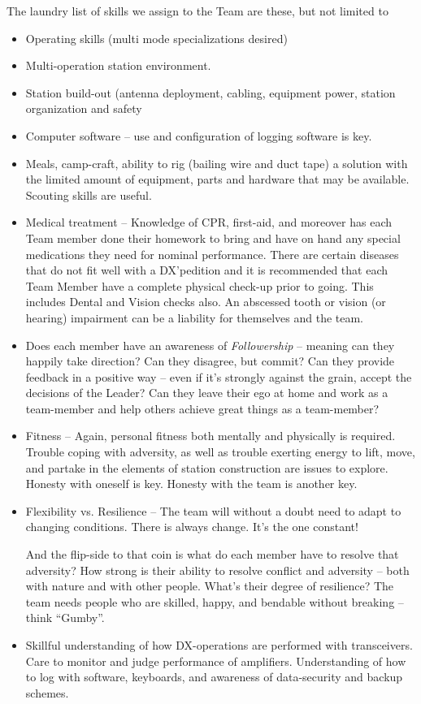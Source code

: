 \documentclass[11pt]{article}
\begin{document}
\par
The laundry list of skills we assign to
the Team are these, but not limited to
\begin{itemize}
\item Operating skills (multi mode specializations desired)
\item Multi-operation station environment.
\item Station build-out (antenna deployment, cabling,
equipment power, station organization and safety
\item Computer software -- use and configuration of logging
software is key.
\item Meals, camp-craft, ability to rig (bailing wire and
duct tape) a solution with the limited amount of equipment,
parts and hardware that may be available.  Scouting skills
are useful.
\item Medical treatment -- Knowledge of CPR, first-aid,
and moreover has each Team member done their homework
to bring and have on hand any special medications they
need for nominal performance.  There are certain
diseases that do not fit well with a DX'pedition and 
it is recommended that each Team Member have a complete
physical check-up prior to going.  This includes Dental
and Vision checks also.  An abscessed tooth or vision (or 
hearing) impairment can be a liability for themselves
and the team.
\item Does each member have an awareness of {\textit{
Followership}} -- meaning can they happily take direction?
Can they disagree, but commit?  Can they provide feedback
in a positive way -- even if it's strongly against
the grain, accept the decisions of the Leader?  Can they
leave their ego at home and work as a team-member and
help others achieve great things as a team-member?
\item Fitness -- Again, personal fitness both mentally
and physically is required.  Trouble coping with adversity,
as well as trouble exerting energy to lift, move, and partake
in the elements of station construction are issues to
explore.  Honesty with oneself is key.  Honesty with the
team is another key.
\item Flexibility vs. Resilience -- The team will
without a doubt need to adapt to changing conditions.   There is
always change.  It's the one constant!
\par
And the flip-side to that coin is what do each member
have to resolve that adversity?  How strong is their
ability to resolve conflict and adversity -- both with
nature and with other people.   What's their degree of
resilience?  The team needs people who are skilled,
happy, and bendable without breaking -- think ``Gumby''.
\item Skillful understanding of how DX-operations
are performed with transceivers.  Care to monitor and
judge performance of amplifiers.  Understanding of how
to log with software, keyboards, and awareness of 
data-security and backup schemes.
\end{itemize}
\end{document}
